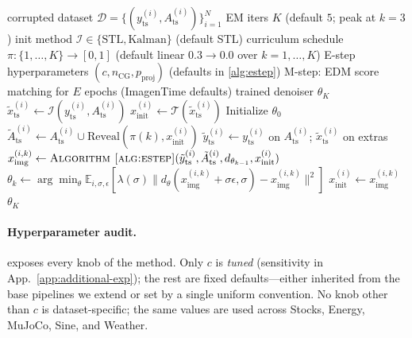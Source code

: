 \documentclass{article}
\theoremstyle{plain}
\theoremstyle{definition}
\theoremstyle{remark}
\newcommand{\tsimg}{\mathcal{T}}
\newcommand{\Ats}{A_{\mathrm{ts}}}
\newcommand{\yts}{y_{\mathrm{ts}}}
\newcommand{\ximg}{x_{\mathrm{img}}}
\begin{document}
\begin{algorithm}[h]
\caption{Co-Evolving EM}
\label{alg:em}
\begin{algorithmic}[1]
\Require corrupted dataset $\mathcal{D} = \{(\yts^{(i)}, \Ats^{(i)})\}_{i=1}^N$
\Require EM iters $K$ (default $5$; peak at $k = 3$)
\Require init method $\mathcal{I} \in \{\mathrm{STL}, \mathrm{Kalman}\}$ (default STL)
\Require curriculum schedule $\pi : \{1, \ldots, K\} \to [0, 1]$ (default linear $0.3 \to 0.0$ over $k = 1, \ldots, K$)
\Require E-step hyperparameters $(c, n_{\mathrm{CG}}, p_{\mathrm{proj}})$ (defaults in \cref{alg:estep})
\Require M-step: EDM score matching for $E$ epochs (ImagenTime defaults)
\Ensure trained denoiser $\theta_K$
 
  \State $\tilde{x}_{\mathrm{ts}}^{(i)} \gets \mathcal{I}(\yts^{(i)}, \Ats^{(i)})$
  \State $x_{\mathrm{init}}^{(i)} \gets \tsimg(\tilde{x}_{\mathrm{ts}}^{(i)})$
\EndFor
\State Initialize $\theta_0$ 
   
    \State $\tilde{A}^{(i)}_{\mathrm{ts}} \gets \Ats^{(i)} \cup \mathrm{Reveal}(\pi(k), x_{\mathrm{init}}^{(i)})$
    \State $\tilde{y}^{(i)}_{\mathrm{ts}} \gets \yts^{(i)}$ on $\Ats^{(i)}$; $\tilde{x}^{(i)}_{\mathrm{ts}}$ on extras
  \EndFor
   
    \State $\ximg^{(i,k)} \gets \Call{Algorithm~\ref{alg:estep}}{\tilde{y}^{(i)}_{\mathrm{ts}}, \tilde{A}^{(i)}_{\mathrm{ts}}, d_{\theta_{k-1}}, x_{\mathrm{init}}^{(i)}}$
  \EndFor
  \State $\theta_k \gets \arg\min_\theta \mathbb{E}_{i, \sigma, \epsilon}[\lambda(\sigma) \|d_\theta(\ximg^{(i,k)} + \sigma\epsilon, \sigma) - \ximg^{(i,k)}\|^2]$ 
   $x_{\mathrm{init}}^{(i)} \gets \ximg^{(i,k)}$ \EndFor
\EndFor
\State \Return $\theta_K$
\end{algorithmic}
\end{algorithm}

\paragraph{Hyperparameter audit.}
 exposes every knob of the method. Only $c$ is \emph{tuned} (sensitivity in App.~\ref{app:additional-exp}); the rest are fixed defaults---either inherited from the base pipelines we extend or set by a single uniform convention. No knob other than $c$ is dataset-specific; the same values are used across Stocks, Energy, MuJoCo, Sine, and Weather.
\end{document}
